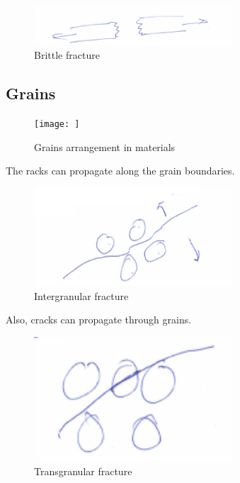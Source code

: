 \documentclass{article}
\begin{document}
\begin{figure}[h!]
	\centering
	\includegraphics[width=0.66\textwidth]{assets/ae4c2aa2.png}
	\caption{Brittle fracture}
\end{figure}

\subsection{Grains}
\begin{figure}[h!]
    \centering
    \texttt{[image: ]}
    \caption{Grains arrangement in materials}
    \label{fig:grains}
\end{figure}

The racks can propagate along the grain boundaries.

\begin{figure}[h!]
	\centering
	\includegraphics[width=0.66\textwidth]{assets/80de7856.png}
	\caption{Intergranular fracture}
\end{figure}

Also, cracks can propagate through grains.

\begin{figure}[h!]
    \centering
    \includegraphics[width=0.66\textwidth]{assets/044358e4.png}
    \caption{Transgranular fracture}
    \label{fig:tg_fracture}
\end{figure}
\end{document}
